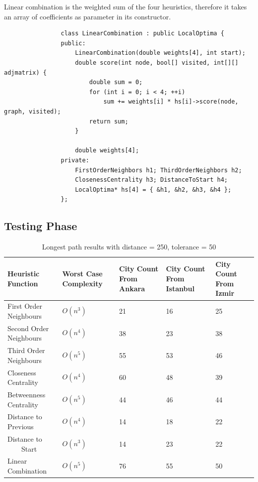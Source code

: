 \documentclass[12pt]{report}
\begin{document}
            Linear combination is the weighted sum of the four heuristics, therefore it takes an array of coefficients as parameter in its constructor. 

            \begin{verbatim}
                class LinearCombination : public LocalOptima {
                public:
                    LinearCombination(double weights[4], int start);
                    double score(int node, bool[] visited, int[][] adjmatrix) {
                        double sum = 0;
                        for (int i = 0; i < 4; ++i) 
                            sum += weights[i] * hs[i]->score(node, graph, visited);
                        return sum;
                    }
                    
                    double weights[4];
                private:
                    FirstOrderNeighbors h1; ThirdOrderNeighbors h2;
                    ClosenessCentrality h3; DistanceToStart h4;
                    LocalOptima* hs[4] = { &h1, &h2, &h3, &h4 };
                };
            \end{verbatim}

        \subsection{Testing Phase}
            \begin{table}[H]
                \centering
                \begin{tabular}{|P{3.5cm}|P{3cm}|P{3cm}|P{3cm}|P{3cm}|}
                \hline
                    \textbf{Heuristic Function} & \textbf{Worst Case Complexity} & \textbf{City Count From Ankara} & \textbf{City Count From Istanbul} & \textbf{City Count From Izmir} \\ \hline
                    First Order Neighbours & $O(n^3)$ & 21 & 16 & 25 \\ \hline
                    Second Order Neighbours & $O(n^4)$ & 38 & 23 & 38 \\ \hline
                    Third Order Neighbours & $O(n^5)$ & 55 & 53 & 46 \\ \hline
                    Closeness Centrality & $O(n^4)$ & 60 & 48 & 39 \\ \hline
                    Betweenness Centrality & $O(n^5)$ & 44 & 46 & 44 \\ \hline
                    Distance to Previous & $O(n^4)$ & 14 & 18 & 22 \\ \hline
                    Distance to \ \ \ \ Start & $O(n^3)$ & 14 & 23 & 22 \\ \hline
                    Linear Combination & $O(n^5)$ & 76 & 55 & 50 \\ \hline
                \end{tabular}
                \caption{Longest path results with distance = 250, tolerance = 50}
            \end{table}
\end{document}
